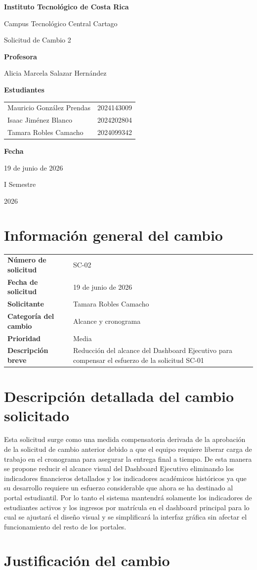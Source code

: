 \documentclass[11pt,spanish]{article}
\title{\DocumentoTitulo}
\author{\AutoresPortada}
\date{\FechaDocumento}
\makeatletter
\newcommand{\Institucion}{Instituto Tecnológico de Costa Rica}
\newcommand{\Campus}{Campus Tecnológico Central Cartago}
\newcommand{\DocumentoTitulo}{Solicitud de Cambio 2}
\newcommand{\Profesor}{Alicia Marcela Salazar Hernández}
\newcommand{\FechaDocumento}{19 de junio de 2026}
\newcommand{\PeriodoAcademico}{I Semestre}
\newcommand{\AnioDocumento}{2026}
\newcommand{\AutoresPortada}{%
    \begin{tabular}{l@{\hspace{1.5cm}}r}
        Mauricio González Prendas & 2024143009\\
        Isaac Jiménez Blanco & 2024202804\\
        Tamara Robles Camacho & 2024099342
    \end{tabular}%
}
\newcommand{\MakeCover}{%
\begin{titlepage}
\thispagestyle{empty}
\centering

{\bfseries \huge \Institucion \par}
\vspace{0.25cm}
{\LARGE \Campus \par}

\vfill

{\huge \DocumentoTitulo \par}

\vfill

{\bfseries \LARGE Profesora \par}
{\Large \Profesor \par}

\vfill

{\bfseries \LARGE Estudiantes \par}
{\Large \AutoresPortada \par}

\vfill

{\bfseries\LARGE Fecha \par}
{\Large \FechaDocumento \par}

\vfill

{\LARGE \PeriodoAcademico \par}
{\LARGE \AnioDocumento \par}

\end{titlepage}%
}
\makeatother
\begin{document}
\hypersetup{pageanchor=false}

\MakeCover

\pagestyle{empty}
\tableofcontents
\clearpage
{}
\hypersetup{pageanchor=true}
\pagestyle{fancy}

\section{Información general del cambio}

\begin{table}[H]
\centering
\begin{tabularx}{\textwidth}{p{5cm} Y}
\toprule
\textbf{Número de solicitud} & SC-02 \\
\textbf{Fecha de solicitud} & 19 de junio de 2026 \\
\textbf{Solicitante} & Tamara Robles Camacho \\
\textbf{Categoría del cambio} & Alcance y cronograma \\
\textbf{Prioridad} & Media \\
\textbf{Descripción breve} & Reducción del alcance del Dashboard Ejecutivo para compensar el esfuerzo de la solicitud SC-01 \\
\bottomrule
\end{tabularx}
\end{table}

\section{Descripción detallada del cambio solicitado}

Esta solicitud surge como una medida compensatoria derivada de la aprobación de la solicitud de cambio anterior debido a que el equipo requiere liberar carga de trabajo en el cronograma para asegurar la entrega final a tiempo. De esta manera se propone reducir el alcance visual del Dashboard Ejecutivo eliminando los indicadores financieros detallados y los indicadores académicos históricos ya que su desarrollo requiere un esfuerzo considerable que ahora se ha destinado al portal estudiantil. Por lo tanto el sistema mantendrá solamente los indicadores de estudiantes activos y los ingresos por matrícula en el dashboard principal para lo cual se ajustará el diseño visual y se simplificará la interfaz gráfica sin afectar el funcionamiento del resto de los portales.

\section{Justificación del cambio}
\end{document}
